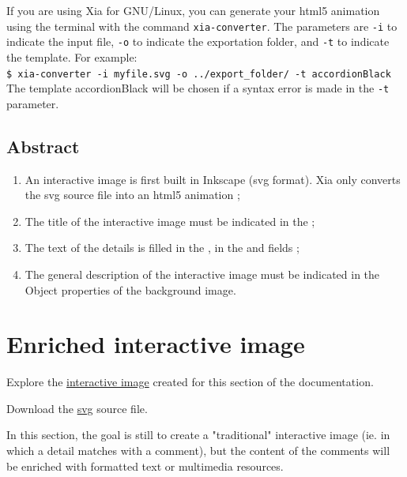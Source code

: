 \begin{astuce}
 If you are using Xia for GNU/Linux, you can generate your html5 animation
 using the terminal with the command \texttt{xia-converter}. The parameters are
 \texttt{-i} to indicate the input file, \texttt{-o} to indicate the exportation folder, and
 \texttt{-t} to indicate the template. For example:\\
 \texttt{\$ xia-converter -i myfile.svg -o ../export\_folder/ -t accordionBlack}\\
 The template accordionBlack will be chosen if a syntax error is made in the \texttt{-t} parameter.
\end{astuce}


\subsection{Abstract}

\begin{enumerate}
 \item An interactive image is first built in Inkscape (svg format). Xia only 
 converts the svg source file into an html5 animation ;
 \item The title of the interactive image must be indicated in the  ;
 \item The text of the details is filled in the , 
 in the  and  fields ;
 \item The general description of the interactive image must be indicated in the \chemin
{Object properties} of the background image.
\end{enumerate}

\section{Enriched interactive image}\label{enriched_IA}

\begin{links}
Explore the \href{http://xia.dane.ac-versailles.fr/demo/tuto/xia2}{interactive image} created for this section of the documentation.

Download the \href{http://xia.dane.ac-versailles.fr/demo/tuto/xia2/svg/xia2.svg}{svg} source file.
\end{links}

In this section, the goal is still to create a "traditional" interactive image 
(ie. in which a detail matches with a comment), but the content of the comments 
will be enriched with  formatted text or multimedia resources.


